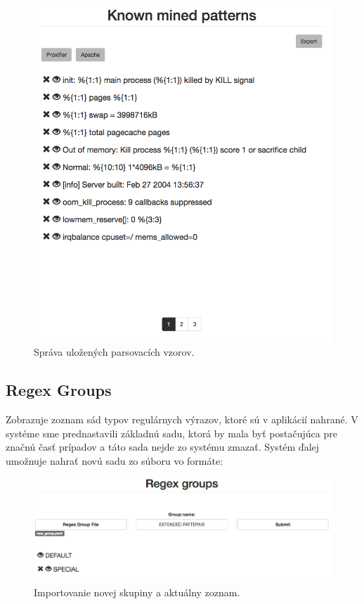 \begin{figure}[htbp]
 \centering 
 \begin{minipage}{0.95\linewidth}
 	\centering
 	\includegraphics[width=\textwidth]{Images/thesis-pattern.png}	
 \end{minipage}
  \caption{Správa uložených parsovacích vzorov.}
  \label{fig:pattern}
\end{figure}

\subsection{Regex Groups}
Zobrazuje zoznam sád typov regulárnych výrazov, ktoré sú v aplikácií nahrané. V systéme sme prednastavili základnú sadu, ktorá by mala byť postačujúca pre značnú časť prípadov a táto sada nejde zo systému zmazať. Systém ďalej umožnuje nahrať novú sadu zo súboru vo formáte:

 \begin{figure}[htbp]
 \centering 
 \begin{minipage}{\linewidth}
 	\centering
 	\includegraphics[width=\textwidth]{Images/thesis-groups.png}	
 \end{minipage}
  \caption{Importovanie novej skupiny a aktuálny zoznam.}
  \label{fig:groups}
\end{figure}
